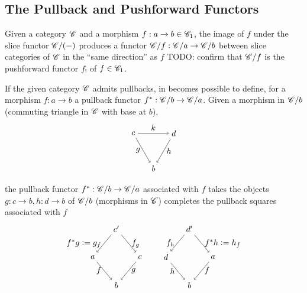 \documentclass[10pt]{article}
\theoremstyle{definition}
\theoremstyle{remark}
\begin{document}
\subsection{The Pullback and Pushforward Functors}

Given a category $\mathscr{C}$ and a morphism $f : a \to b \in \mathscr{C}_1$, the image of $f$ under the slice functor $\mathscr{C} / (-)$ produces a functor $\mathscr{C} / f : \mathscr{C} / a \to \mathscr{C} / b$ between slice categories of $\mathscr{C}$ in the ``same direction'' as $f$ \textcolor{red!50!black}{TODO: confirm that $\mathscr{C} / f$ is the pushforward functor $f_{!}$ of $f \in \mathscr{C}_1$.}

If the given category $\mathscr{C}$ admits pullbacks, in becomes possible to define, for a morphism $f : a \to b$ a pullback functor $f^{*} : \mathscr{C} / b \to \mathscr{C} / a$. Given a morphism in $\mathscr{C}/b$ (commuting triangle in $\mathscr{C}$ with base at $b$),
\[
    \begin{tikzpicture}
        \begin{scope}[shift={(+3,0)}]
            \draw (150:1) node(ltl){$c$};
            \draw ( 30:1) node(ltr){$d$};
            \draw (270:1) node(lbm){$b$};

            \draw[->] (ltl) to node[below,left ]{$g$}  (lbm);
            \draw[->] (ltr) to node[below,right]{$h$} (lbm);
            \draw[->] (ltl) to node[above]{$k$} (ltr);
        \end{scope}
    \end{tikzpicture}
\]
the pullback functor $f^{\ast} : \mathscr{C} / b \to \mathscr{C} / a$ associated with $f$ takes the objects $g : c \to b, h : d \to b$ of $\mathscr{C}/b$ (morphisms in $\mathscr{C}$) completes the pullback squares associated with $f$
\[
    \begin{tikzpicture}
        \begin{scope}[shift={(0,0)}]
            \draw ( 90:1.2) node(t){$c'$};
            \draw (180:1) node(l){$a$};
            \draw (  0:1) node(r){$c$};
            \draw (270:1.2) node(b){$b$};

            \draw[->] (l) to node[below,left ]{$f$} (b);
            \draw[->] (r) to node[below,right]{$g$} (b);
            \draw[->] (t) to node[above,left ]{$f^{\ast}g \vcentcolon= g_{f}$} (l);
            \draw[->] (t) to node[above,right]{$f_{g}$} (r);
        \end{scope}
    \end{tikzpicture}
    \qquad
    \begin{tikzpicture}
        \begin{scope}[shift={(0,0)}]
            \draw ( 90:1.2) node(t){$d'$};
            \draw (180:1) node(l){$d$};
            \draw (  0:1) node(r){$a$};
            \draw (270:1.2) node(b){$b$};

            \draw[->] (l) to node[below,left ]{$h$} (b);
            \draw[->] (r) to node[below,right]{$f$} (b);
            \draw[->] (t) to node[above,left ]{$f_{h}$} (l);
            \draw[->] (t) to node[above,right]{$f^{\ast}h \vcentcolon= h_{f}$} (r);
        \end{scope}
    \end{tikzpicture}
\]
\end{document}
